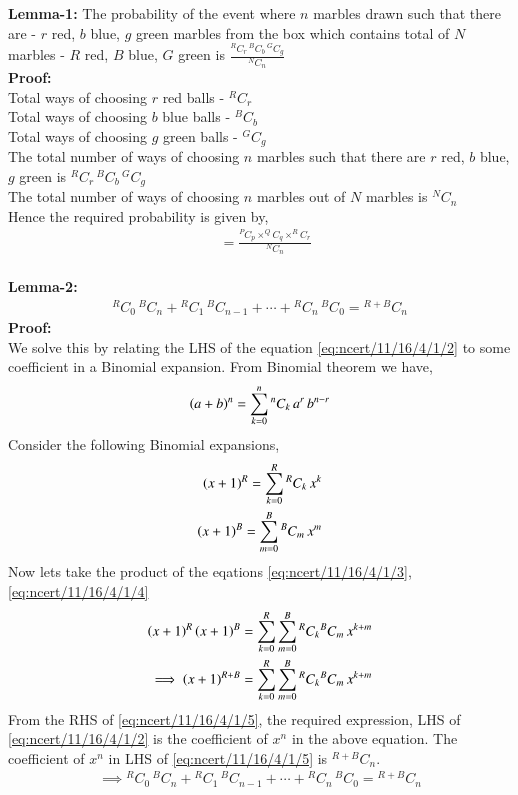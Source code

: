 \documentclass[journal,12pt,twocolumn]{IEEEtran}
\begin{document}
\begin{enumerate}
\textbf{Lemma-1:}
The probability of the event where $n$ marbles drawn such that there are - $r$ red, $b$ blue, $g$ green marbles from the box which contains total of $N$ marbles - $R$ red, $B$ blue, $G$ green is $\frac{^{R}C_{r} \, ^{B}C_{b} \, ^{G}C_{g}}{^{N}C_{n}}$\\
\textbf{Proof:} \\
Total ways of choosing $r$ red balls - $^{R}C_{r}$\\
Total ways of choosing $b$ blue balls - $^{B}C_{b}$\\
Total ways of choosing $g$ green balls - $^{G}C_{g}$\\
The total number of ways of choosing $n$ marbles such that there are $r$ red, $b$ blue, $g$ green is $^{R}C_{r} \, ^{B}C_{b} \, ^{G}C_{g}$\\
The total number of ways of choosing $n$ marbles out of $N$ marbles is $^{N}C_{n}$\\
Hence the required probability is given by,
\begin{align}
&= \frac{^{P}C_{p} \times ^{Q}C_{q} \times ^{R}C_{r}}{^{N}C_{n}}
\label{eq:ncert/11/16/4/1/1}
\end{align}
\\
\textbf{Lemma-2:} 
\begin{align}
{^{R}C_{0}} \, {^{B}C_{n}} + {^{R}C_{1}} \, {^{B}C_{n-1}} + \cdots + {^{R}C_{n}} \, {^{B}C_{0}} = {^{R+B}C_{n}} \label{eq:ncert/11/16/4/1/2}
\end{align}
\textbf{Proof:} \\
We solve this by relating the LHS of the equation \eqref{eq:ncert/11/16/4/1/2} to some coefficient in a Binomial expansion. From Binomial theorem we have,
\begin{align}
\left(a+b\right)^n = \sum_{k = 0}^{n} {^{n}C_{k}} \, a^r \, b^{n-r}
\end{align}
Consider the following Binomial expansions,
\begin{align}
\left(x+1\right)^R = \sum_{k = 0}^{R} {^{R}C_{k}} \, x^k \label{eq:ncert/11/16/4/1/3}\\
\left(x+1\right)^B = \sum_{m = 0}^{B} {^{B}C_{m}} \, x^m \label{eq:ncert/11/16/4/1/4}
\end{align}
Now lets take the product of the eqations \eqref{eq:ncert/11/16/4/1/3}, \eqref{eq:ncert/11/16/4/1/4}
\begin{align}
\left(x+1\right)^R \left(x+1\right)^B = \sum_{k = 0}^{R} \sum_{m = 0}^{B} {^{R}C_{k}} {^{B}C_{m}}\, x^{k+m}\\
\implies \left(x+1\right)^{R+B} = \sum_{k = 0}^{R} \sum_{m = 0}^{B} {^{R}C_{k}} {^{B}C_{m}}\, x^{k+m} \label{eq:ncert/11/16/4/1/5}
\end{align} 
From the RHS of \eqref{eq:ncert/11/16/4/1/5}, the required expression, LHS of \eqref{eq:ncert/11/16/4/1/2} is the coefficient of $x^{n}$ in the above equation. The coefficient of $x^{n}$ in LHS of \eqref{eq:ncert/11/16/4/1/5} is ${^{R+B}C_{n}}$. 
\begin{align}
\implies {^{R}C_{0}} \, {^{B}C_{n}} + {^{R}C_{1}} \, {^{B}C_{n-1}} + \cdots + {^{R}C_{n}} \, {^{B}C_{0}} = {^{R+B}C_{n}} 
\end{align}



\end{enumerate}
\end{document}
